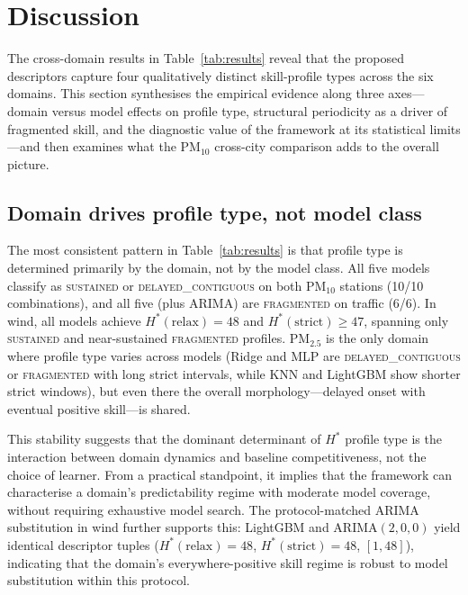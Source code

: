 \documentclass[pdflatex,sn-mathphys]{sn-jnl}
\begin{document}
\section{Discussion}\label{sec:discussion}

The cross-domain results in Table~\ref{tab:results} reveal that the proposed descriptors capture four qualitatively distinct skill-profile types across the six domains. This section synthesises the empirical evidence along three axes—domain versus model effects on profile type, structural periodicity as a driver of fragmented skill, and the diagnostic value of the framework at its statistical limits—and then examines what the PM$_{10}$ cross-city comparison adds to the overall picture.

\subsection{Domain drives profile type, not model class}

The most consistent pattern in Table~\ref{tab:results} is that profile type is determined primarily by the domain, not by the model class. All five models classify as \textsc{sustained} or \textsc{delayed\_contiguous} on both PM$_{10}$ stations (10/10 combinations), and all five (plus ARIMA) are \textsc{fragmented} on traffic (6/6). In wind, all models achieve $H^*(\mathrm{relax})=48$ and $H^*(\mathrm{strict})\geq 47$, spanning only \textsc{sustained} and near-sustained \textsc{fragmented} profiles. PM$_{2.5}$ is the only domain where profile type varies across models (Ridge and MLP are \textsc{delayed\_contiguous} or \textsc{fragmented} with long strict intervals, while KNN and LightGBM show shorter strict windows), but even there the overall morphology—delayed onset with eventual positive skill—is shared.

This stability suggests that the dominant determinant of $H^*$ profile type is the interaction between domain dynamics and baseline competitiveness, not the choice of learner. From a practical standpoint, it implies that the framework can characterise a domain's predictability regime with moderate model coverage, without requiring exhaustive model search. The protocol-matched ARIMA substitution in wind further supports this: LightGBM and ARIMA$(2,0,0)$ yield identical descriptor tuples ($H^*(\mathrm{relax})=48$, $H^*(\mathrm{strict})=48$, $[1,48]$), indicating that the domain's everywhere-positive skill regime is robust to model substitution within this protocol.
\end{document}
